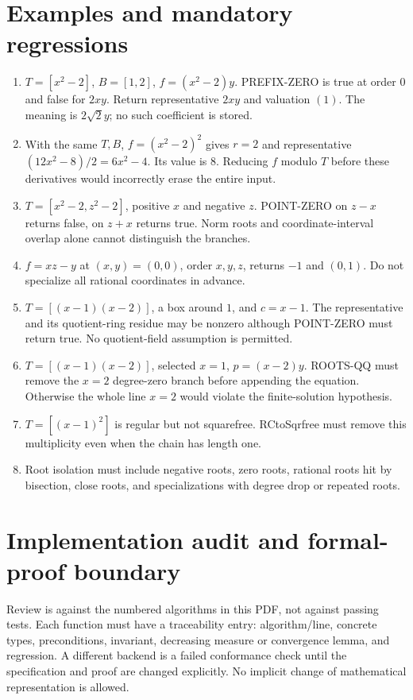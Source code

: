 \documentclass[11pt]{article}
\theoremstyle{definition}
\begin{document}
\section{Examples and mandatory regressions}
\begin{enumerate}
\item $T=[x^2-2]$, $B=[1,2]$, $f=(x^2-2)y$.
PREFIX-ZERO is true at order 0 and false for $2xy$.
Return representative $2xy$ and valuation $(1)$. The meaning is $2\sqrt2 y$;
no such coefficient is stored.
\item With the same $T,B$, $f=(x^2-2)^2$ gives $r=2$ and representative
$(12x^2-8)/2=6x^2-4$. Its value is $8$. Reducing $f$ modulo $T$ before
these derivatives would incorrectly erase the entire input.
\item $T=[x^2-2,z^2-2]$, positive $x$ and negative $z$.
POINT-ZERO on $z-x$ returns false, on $z+x$ returns true. Norm roots and
coordinate-interval overlap alone cannot distinguish the branches.
\item $f=xz-y$ at $(x,y)=(0,0)$, order $x,y,z$, returns $-1$ and $(0,1)$.
Do not specialize all rational coordinates in advance.
\item $T=[(x-1)(x-2)]$, a box around $1$, and $c=x-1$.
The representative and its quotient-ring residue may be nonzero although
POINT-ZERO must return true. No quotient-field assumption is permitted.
\item $T=[(x-1)(x-2)]$, selected $x=1$, $p=(x-2)y$.
ROOTS-QQ must remove the $x=2$ degree-zero branch before appending the equation.
Otherwise the whole line $x=2$ would violate the finite-solution hypothesis.
\item $T=[(x-1)^2]$ is regular but not squarefree. RCtoSqrfree must remove this
multiplicity even when the chain has length one.
\item Root isolation must include negative roots, zero roots, rational roots hit
by bisection, close roots, and specializations with degree drop or repeated roots.
\end{enumerate}

\section{Implementation audit and formal-proof boundary}
Review is against the numbered algorithms in this PDF, not against passing tests.
Each function must have a traceability entry: algorithm/line, concrete types,
preconditions, invariant, decreasing measure or convergence lemma, and regression.
A different backend is a failed conformance check until the specification and proof
are changed explicitly. No implicit change of mathematical representation is allowed.
\end{document}
